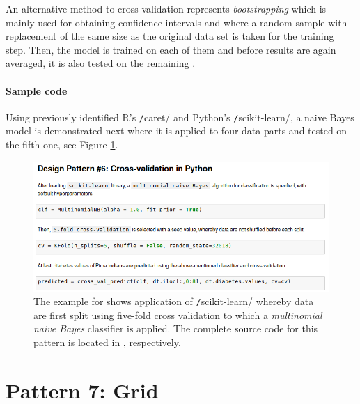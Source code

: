 An alternative method to cross-validation represents \emph{bootstrapping} which is mainly used for obtaining confidence intervals and where a random sample with replacement of the same size as the original data set is taken for the training step. 
Then, the model is trained on each of them and before results are again averaged, it is also tested on the remaining  \parencites{Kohavi:1995:SCB:1643031.1643047}{BookCV201}{Gutierrez-Osuna2002LECTURECross-validation}.  

\paragraph*{Sample code}
Using previously identified R's \texttt/caret/ and Python's \texttt/scikit-learn/, a naive Bayes model is demonstrated next where it is applied to four data parts and tested on the fifth one, see Figure \ref{lst:code_pattern7}. 

\begin{figure}[h]
\centering
\includegraphics[width=\textwidth,height=\textheight,keepaspectratio]{images_dp/code_listing_6_cv}
\caption[Example for Cross-validation Design Pattern.]{The example for  shows application of \texttt/scikit-learn/ whereby data are first split using five-fold cross validation to which a \emph{multinomial naive Bayes} classifier is applied. 
The complete source code for this pattern is located in ,  respectively.}
\label{lst:code_pattern7}
\end{figure}

\section{Pattern 7: Grid}

